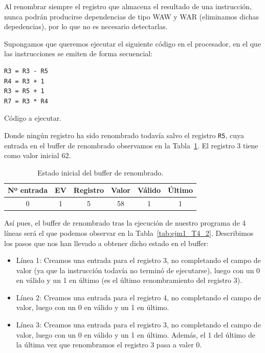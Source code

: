 Al renombrar siempre el registro que almacena el resultado de una instrucción, nunca podrán producirse dependencias de tipo WAW y WAR (eliminamos dichas depedencias), por lo que no es necesario detectarlas.

\begin{ejemplo}\label{ejm:T4_1}
    Supongamos que queremos ejecutar el siguiente código en el procesador, en el que las instrucciones se emiten de forma secuencial:
    \begin{listing}[H]
    \begin{verbatim}
R3 = R3 - R5
R4 = R3 + 1
R3 = R5 + 1
R7 = R3 * R4
    \end{verbatim}
    \caption{Código a ejecutar.}
    \label{cod:ejm1_T4}
    \end{listing}
    Donde ningún registro ha sido renombrado todavía salvo el registro \verb|R5|, cuya entrada en el buffer de renombrado observamos en la Tabla~\ref{tab:ejm1_T4}. El registro 3 tiene como valor inicial 62.
    \begin{table}[H]
    \centering
    \begin{tabular}{|c|c|c|c|c|c|}
        \hline
        Nº entrada & EV & Registro & Valor & Válido & Último \\
        \hline
        0 & 1 & 5 & 58 & 1 & 1 \\
        \hline
    \end{tabular}
    \caption{Estado inicial del buffer de renombrado.}
    \label{tab:ejm1_T4}
    \end{table}
    Así pues, el buffer de renombrado tras la ejecución de nuestro programa de 4 líneas será el que podemos observar en la Tabla~\ref{tab:ejm1_T4_2}. Describimos los pasos que nos han llevado a obtener dicho estado en el buffer:
    \begin{itemize}
        \item Línea 1: Creamos una entrada para el registro 3, no completando el campo de valor (ya que la instrucción todavía no terminó de ejecutarse), luego con un 0 en válido y un 1 en último (es el último renombramiento del registro 3).
        \item Línea 2: Creamos una entrada para el registro 4, no completando el campo de valor, luego con un 0 en válido y un 1 en último.
        \item Línea 3: Creamos una entrada para el registro 3, no completando el campo de valor, luego con un 0 en válido y un 1 en último. Además, el 1 del último de la última vez que renombramos el registro 3 pasa a valer 0.

\end{itemize}
\end{ejemplo}

